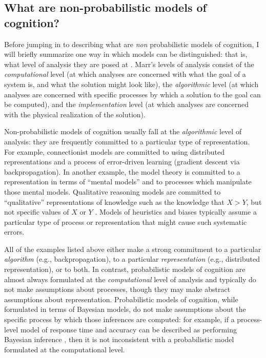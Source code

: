\documentclass[12pt]{article}
\begin{document}
\subsection*{What are non-probabilistic models of cognition?}

Before jumping in to describing what are \textit{non} probabilistic models of cognition, I will briefly summarize one way in which models can be distinguished: that is, what level of analysis they are posed at \citep{Marr1971}. Marr's levels of analysis consist of the \textit{computational} level (at which analyses are concerned with what the goal of a system is, and what the solution might look like), the \textit{algorithmic} level (at which analyses are concerned with specific processes by which a solution to the goal can be computed), and the \textit{implementation} level (at which analyses are concerned with the physical realization of the solution).

Non-probabilistic models of cognition usually fall at the \textit{algorithmic} level of analysis: they are frequently committed to a particular type of representation. For example, connectionist models are committed to using distributed representations and a process of error-driven learning (gradient descent via backpropagation). In another example, the model theory \citep{Johnson-Laird2012} is committed to a representation in terms of ``mental models'' and to processes which manipulate those mental models. Qualitative reasoning models are committed to ``qualitative'' representations of knowledge such as the knowledge that $X>Y$, but not specific values of $X$ or $Y$ \citep{Kuipers1986,Forbus2011}. Models of heuristics and biases \citep{Kahneman1973,Tversky1974} typically assume a particular type of process or representation that might cause such systematic errors.

All of the examples listed above either make a strong commitment to a particular \textit{algorithm} (e.g., backpropagation), to a particular \textit{representation} (e.g., distributed representation), or to both. In contrast, probabilistic models of cognition are almost always formulated at the \textit{computational} level of analysis and typically do not make assumptions about processes, though they may make abstract assumptions about representation. Probabilistic models of cognition, while formulated in terms of Bayesian models, do not make assumptions about the specific process by which those inferences are computed: for example, if a process-level model of response time and accuracy can be described as performing Bayesian inference \citep{Bitzer2014}, then it is not inconsistent with a probabilistic model formulated at the computational level.
\end{document}
